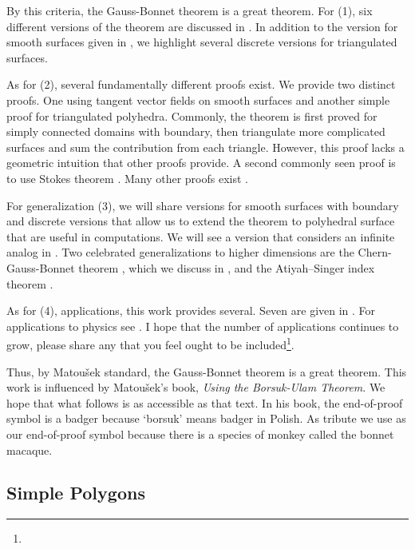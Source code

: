 By this criteria, the Gauss-Bonnet theorem is a great theorem.
For (1), six different versions of the theorem are discussed
in \cite{wu_historical_2008}. 
In addition to the version for smooth surfaces given in ,
we highlight several discrete versions for triangulated surfaces. 
 
 
 
As for (2), several fundamentally different proofs exist.
We provide two distinct proofs. One using tangent vector fields on smooth surfaces and
another simple proof for triangulated polyhedra.
Commonly, the theorem is first proved for simply connected domains
with boundary, then triangulate more complicated surfaces and sum the contribution from each triangle.
However, this proof  lacks a geometric intuition that other proofs provide\cite{wu_historical_2008}.
A second commonly seen proof is to use Stokes theorem  \cite{doc76,pressley_elementary_2010}.
Many other proofs exist \cite{guillemin_differential_2010,levi-bicycle,grinfeld_introduction_2013,li_gauss-bonnet-chern_2011}.


For generalization (3), we will share versions for smooth
surfaces with boundary and discrete versions that allow us to extend the theorem to 
polyhedral surface that are useful in computations. We will see a version that considers
an infinite analog  in .
Two  celebrated generalizations to higher dimensions are the Chern-Gauss-Bonnet theorem \cite{chern_simple_1944}, which we
discuss in , and
the Atiyah–Singer index theorem  \cite{atiyah_index_1963}.




As for (4), applications, this work provides several. Seven are given in \cite{doc76}.
For applications to physics see \cite{tirado-physics-apps,gibbons_applications_2008}.
I hope that the number of applications continues to grow,
please share any that you feel
ought to be included\footnote{}.

Thus, by Matou\v{s}ek standard, the Gauss-Bonnet theorem is a great theorem.
This work is influenced by Matou\v{s}ek's book, \emph{Using the Borsuk-Ulam Theorem}.
We hope that what follows is as accessible as that text. In his book, the end-of-proof symbol is
a badger because `borsuk' means badger in Polish. As tribute we use \macaque as 
our end-of-proof symbol because there is a species of monkey called the bonnet macaque.



\subsection{Simple Polygons}
\label{sec:warm-up}

